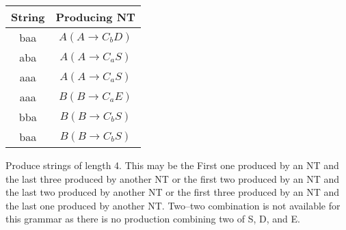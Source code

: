 \documentclass[a4,9pt]{beamer}
\begin{document}
\begin{frame}
\begin{center}
\begin{tabular}{cc}
\hline

\hline

\hline

\hline
String & Producing NT \\
\hline
baa & $A (A \rightarrow C_{b}D)$ \\
aba & $A (A \rightarrow C_{a}S)$ \\
aaa & $A (A \rightarrow C_{a}S)$ \\
aaa & $B (B \rightarrow C_{a}E)$ \\
bba & $B (B \rightarrow C_{b}S)$ \\
baa & $B (B \rightarrow C_{b}S)$ \\
\hline

\hline

\hline

\hline

\end{tabular}
\end{center}

\vspace*{0.1cm}
\hspace*{0.5cm} Produce strings of length 4. This may be the First one produced by an NT and the last three produced
by another NT or the first two produced by an NT and the last two produced by another NT or the first
three produced by an NT and the last one produced by another NT. Two–two combination is not available
for this grammar as there is no production combining two of S, D, and E.\\
\end{frame}
\end{document}
